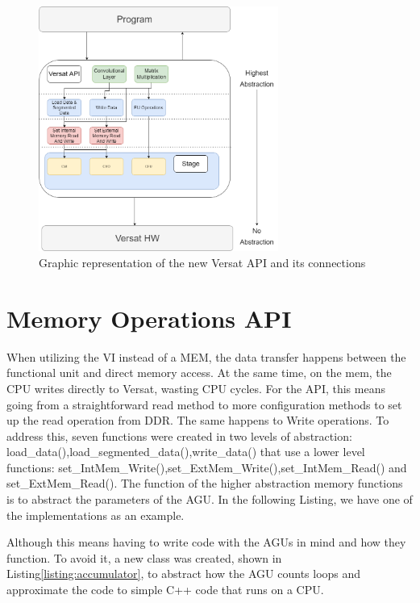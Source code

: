 \begin{figure}[!htbp]
    \centering
    \includegraphics[width=0.7\textwidth]{Figures/VersatMemory.drawio.png}
    \caption{Graphic representation of the new Versat API and its connections}
    \label{newAPI}
\end{figure} 


\section{Memory Operations API}

When utilizing the VI instead of a MEM, the data transfer happens between the functional unit and direct memory access. At the same time,
on the mem, the CPU writes directly to Versat, wasting CPU cycles. For the API, this means going from a straightforward read method
to more configuration methods to set up the read operation from DDR. The same happens to Write operations. To address this, seven functions were created in two levels of abstraction:
load\_data(),load\_segmented\_data(),write\_data() that use a lower level functions: set\_IntMem\_Write(),set\_ExtMem\_Write(),set\_IntMem\_Read() and set\_ExtMem\_Read().
The function of the higher abstraction memory functions is to abstract the parameters of the AGU. In the following Listing, we have one of the implementations
as an example.




Although this means having to write code with the AGUs in mind
and how they function. To avoid it, a new class was created, shown in Listing\ref*{listing:accumulator},
to abstract how the AGU counts loops and approximate 
the code to simple C++ code that runs on a CPU.

